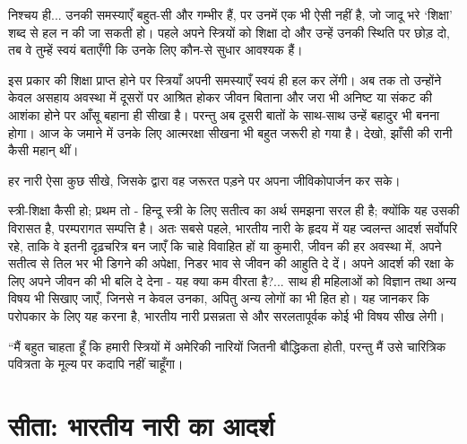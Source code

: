 
निश्चय ही... उनकी समस्याएँ बहुत-सी और गम्भीर हैं, पर उनमें एक भी ऐसी नहीं है, जो जादू भरे ‘शिक्षा’ शब्द से हल न की जा सकती हो। पहले अपने स्त्रियों को शिक्षा दो और उन्हें उनकी स्थिति पर छोड़ दो, तब वे तुम्हें स्वयं बताएँगी कि उनके लिए कौन-से सुधार आवश्यक हैं। 

इस प्रकार की शिक्षा प्राप्त होने पर स्त्रियाँ अपनी समस्याएँ स्वयं ही हल कर लेंगी। अब तक तो उन्होंने केवल असहाय अवस्था में दूसरों पर आश्रित होकर जीवन बिताना और जरा भी अनिष्ट या संकट की आशंका होने पर आँसू बहाना ही सीखा है। परन्तु अब दूसरी बातों के साथ-साथ उन्हें बहादुर भी बनना होगा। आज के जमाने में उनके लिए आत्मरक्षा सीखना भी बहुत जरूरी हो गया है। देखो, झाँसी की रानी कैसी महान् थीं। 

हर नारी ऐसा कुछ सीखे, जिसके द्वारा वह जरूरत पड़ने पर अपना जीविकोपार्जन कर सके। 

स्त्री-शिक्षा कैसी हो; प्रथम तो - हिन्दू स्त्री के लिए सतीत्व का अर्थ समझना सरल ही है; क्योंकि यह उसकी विरासत है, परम्परागत सम्पत्ति है। अतः सबसे पहले, भारतीय नारी के हृदय में यह ज्वलन्त आदर्श सर्वोपरि रहे, ताकि वे इतनी दृढ़चरित्र बन जाएँ कि चाहे विवाहित हों या कुमारी, जीवन की हर अवस्था में, अपने सतीत्व से तिल भर भी डिगने की अपेक्षा, निडर भाव से जीवन की आहुति दे दें। अपने आदर्श की रक्षा के लिए अपने जीवन की भी बलि दे देना - यह क्या कम वीरता है?... साथ ही महिलाओं को विज्ञान तथा अन्य विषय भी सिखाए जाएँ, जिनसे न केवल उनका, अपितु अन्य लोगों का भी हित हो। यह जानकर कि परोपकार के लिए यह करना है, भारतीय नारी प्रसन्नता से और सरलतापूर्वक कोई भी विषय सीख लेगी। 

“मैं बहुत चाहता हूँ कि हमारी स्त्रियों में अमेरिकी नारियों जितनी बौद्धिकता होती, परन्तु मैं उसे चारित्रिक पवित्रता के मूल्य पर कदापि नहीं चाहूँगा।


\section*{सीता: भारतीय नारी का आदर्श}



